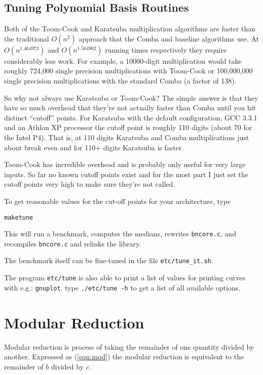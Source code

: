 \documentclass[synpaper]{book}
\begin{document}
\section{Tuning Polynomial Basis Routines}

Both of the Toom-Cook and Karatsuba multiplication algorithms are faster than the traditional $O(n^2)$ approach that
the Comba and baseline algorithms use.  At $O(n^{1.464973})$ and $O(n^{1.584962})$ running times respectively they require
considerably less work.  For example, a 10000-digit multiplication would take roughly 724,000 single precision
multiplications with Toom-Cook or 100,000,000 single precision multiplications with the standard Comba (a factor
of 138).

So why not always use Karatsuba or Toom-Cook?   The simple answer is that they have so much overhead that they're not
actually faster than Comba until you hit distinct  ``cutoff'' points.  For Karatsuba with the default configuration,
GCC 3.3.1 and an Athlon XP processor the cutoff point is roughly 110 digits (about 70 for the Intel P4).  That is, at
110 digits Karatsuba and Comba multiplications just about break even and for 110+ digits Karatsuba is faster.

Toom-Cook has incredible overhead and is probably only useful for very large inputs.  So far no known cutoff points
exist and for the most part I just set the cutoff points very high to make sure they're not called.

To get reasonable values for the cut-off points for your architecture, type

\begin{alltt}
make tune
\end{alltt}

This will run a benchmark, computes the medians, rewrites \texttt{bncore.c}, and recompiles \texttt{bncore.c} and relinks the library.

The benchmark itself can be fine-tuned in the file \texttt{etc/tune\_it.sh}.

The program \texttt{etc/tune} is also able to print a list of values for printing curves with e.g.: \texttt{gnuplot}. type \texttt{./etc/tune -h} to get a list of all available options.

\chapter{Modular Reduction}

Modular reduction is process of taking the remainder of one quantity divided by another.  Expressed
as (\ref{eqn:mod}) the modular reduction is equivalent to the remainder of $b$ divided by $c$.
\end{document}
